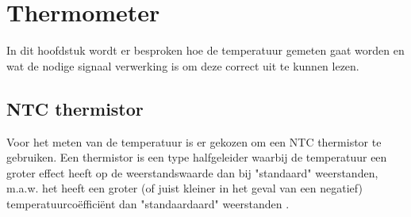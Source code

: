 \documentclass[a4paper, 11pt]{article} %
\begin{document}
	\section{Thermometer} \label{sec::thermometer}
	In dit hoofdstuk wordt er besproken hoe de temperatuur gemeten gaat worden en wat de nodige signaal verwerking is om deze correct uit te kunnen lezen.
	\subsection{NTC thermistor} \label{subsec::NTC_thermistor}
	Voor het meten van de temperatuur is er gekozen om een NTC thermistor te gebruiken. Een thermistor is een type halfgeleider waarbij de temperatuur een groter effect heeft op de weerstandswaarde dan bij "standaard" weerstanden, m.a.w. het heeft een groter (of juist kleiner in het geval van een negatief) temperatuurcoëfficiënt dan "standaardaard" weerstanden \cite{thermistor}.
	\newpage
\end{document}
